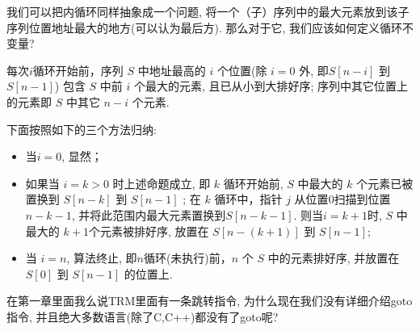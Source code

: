 我们可以把内循环同样抽象成一个问题, 将一个（子）序列中的最大元素放到该子序列位置地址最大的地方(可以认为最后方). 那么对于它, 我们应该如何定义循环不变量? 

每次$i$循环开始前，序列 $S$ 中地址最高的 $i$ 个位置(除 $i=0$ 外, 即$S[n-i]$ 到 $S[n-1]$) 包含 $S$ 中前 $i$ 个最大的元素, 且已从小到大排好序; 序列中其它位置上的元素即 $S$ 中其它 $n-i$ 个元素. 

下面按照如下的三个方法归纳: 

\begin{itemize}
	\item 当$i=0$, 显然；
	\item 如果当 $i=k>0$ 时上述命题成立, 即 $k$ 循环开始前,  $S$ 中最大的 $k$ 个元素已被置换到 $S[n-k]$ 到 $S[n-1]$ ; 在 $k$ 循环中，指针 $j$ 从位置$0$扫描到位置$n-k-1$, 并将此范围内最大元素置换到$S[n-k-1]$. 则当$i=k+1$时, $S$ 中最大的 $k+1$个元素被排好序, 放置在 $S[n-(k+1)]$ 到 $S[n-1]$;
	\item 当 $i=n$, 算法终止, 即$n$循环(未执行)前，$n$ 个 $S$ 中的元素排好序, 并放置在 $S[0]$ 到 $S[n-1]$ 的位置上. 
 

\end{itemize}

\begin{bonus}
	在第一章里面我么说TRM里面有一条跳转指令, 为什么现在我们没有详细介绍goto指令, 并且绝大多数语言(除了C,C++)都没有了goto呢?
\end{bonus}

